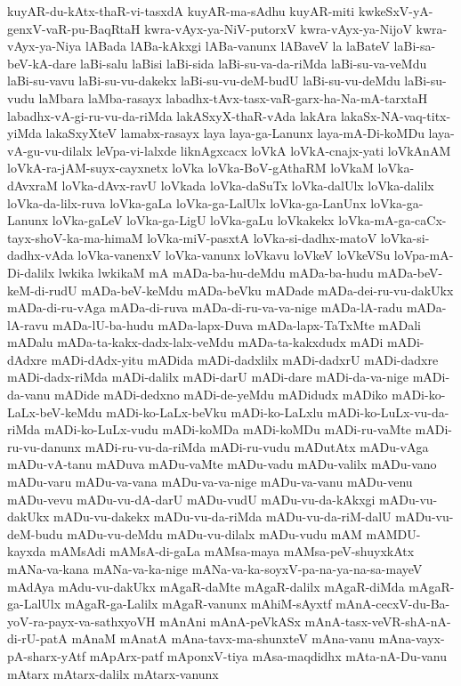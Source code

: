 {kuyAR-du-kAtx-thaR-vi-tasxdA
kuyAR-ma-sAdhu
kuyAR-miti
kwkeSxV-yA-genxV-vaR-pu-BaqRtaH
kwra-vAyx-ya-NiV-putorxV
kwra-vAyx-ya-NijoV
kwra-vAyx-ya-Niya
lABada
lABa-kAkxgi
lABa-vanunx
lABaveV
la
laBateV
laBi-sa-beV-kA-dare
laBi-salu
laBisi
laBi-sida
laBi-su-va-da-riMda
laBi-su-va-veMdu
laBi-su-vavu
laBi-su-vu-dakekx
laBi-su-vu-deM-budU
laBi-su-vu-deMdu
laBi-su-vudu
laMbara
laMba-rasayx
labadhx-tAvx-tasx-vaR-garx-ha-Na-mA-tarxtaH
labadhx-vA-gi-ru-vu-da-riMda
lakASxyX-thaR-vAda
lakAra
lakaSx-NA-vaq-titx-yiMda
lakaSxyXteV
lamabx-rasayx
laya
laya-ga-Lanunx
laya-mA-Di-koMDu
laya-vA-gu-vu-dilalx
leVpa-vi-lalxde
liknAgxcacx
loVkA
loVkA-cnajx-yati
loVkAnAM
loVkA-ra-jAM-suyx-cayxnetx
loVka
loVka-BoV-gAthaRM
loVkaM
loVka-dAvxraM
loVka-dAvx-ravU
loVkada
loVka-daSuTx
loVka-dalUlx
loVka-dalilx
loVka-da-lilx-ruva
loVka-gaLa
loVka-ga-LalUlx
loVka-ga-LanUnx
loVka-ga-Lanunx
loVka-gaLeV
loVka-ga-LigU
loVka-gaLu
loVkakekx
loVka-mA-ga-caCx-tayx-shoV-ka-ma-himaM
loVka-miV-pasxtA
loVka-si-dadhx-matoV
loVka-si-dadhx-vAda
loVka-vanenxV
loVka-vanunx
loVkavu
loVkeV
loVkeVSu
loVpa-mA-Di-dalilx
lwkika
lwkikaM
mA
mADa-ba-hu-deMdu
mADa-ba-hudu
mADa-beV-keM-di-rudU
mADa-beV-keMdu
mADa-beVku
mADade
mADa-dei-ru-vu-dakUkx
mADa-di-ru-vAga
mADa-di-ruva
mADa-di-ru-va-va-nige
mADa-lA-radu
mADa-lA-ravu
mADa-lU-ba-hudu
mADa-lapx-Duva
mADa-lapx-TaTxMte
mADali
mADalu
mADa-ta-kakx-dadx-lalx-veMdu
mADa-ta-kakxdudx
mADi
mADi-dAdxre
mADi-dAdx-yitu
mADida
mADi-dadxlilx
mADi-dadxrU
mADi-dadxre
mADi-dadx-riMda
mADi-dalilx
mADi-darU
mADi-dare
mADi-da-va-nige
mADi-da-vanu
mADide
mADi-dedxno
mADi-de-yeMdu
mADidudx
mADiko
mADi-ko-LaLx-beV-keMdu
mADi-ko-LaLx-beVku
mADi-ko-LaLxlu
mADi-ko-LuLx-vu-da-riMda
mADi-ko-LuLx-vudu
mADi-koMDa
mADi-koMDu
mADi-ru-vaMte
mADi-ru-vu-danunx
mADi-ru-vu-da-riMda
mADi-ru-vudu
mADutAtx
mADu-vAga
mADu-vA-tanu
mADuva
mADu-vaMte
mADu-vadu
mADu-valilx
mADu-vano
mADu-varu
mADu-va-vana
mADu-va-va-nige
mADu-va-vanu
mADu-venu
mADu-vevu
mADu-vu-dA-darU
mADu-vudU
mADu-vu-da-kAkxgi
mADu-vu-dakUkx
mADu-vu-dakekx
mADu-vu-da-riMda
mADu-vu-da-riM-dalU
mADu-vu-deM-budu
mADu-vu-deMdu
mADu-vu-dilalx
mADu-vudu
mAM
mAMDU-kayxda
mAMsAdi
mAMsA-di-gaLa
mAMsa-maya
mAMsa-peV-shuyxkAtx
mANa-va-kana
mANa-va-ka-nige
mANa-va-ka-soyxV-pa-na-ya-na-sa-mayeV
mAdAya
mAdu-vu-dakUkx
mAgaR-daMte
mAgaR-dalilx
mAgaR-diMda
mAgaR-ga-LalUlx
mAgaR-ga-Lalilx
mAgaR-vanunx
mAhiM-sAyxtf
mAnA-cecxV-du-Ba-yoV-ra-payx-va-sathxyoVH
mAnAni
mAnA-peVkASx
mAnA-tasx-veVR-shA-nA-di-rU-patA
mAnaM
mAnatA
mAna-tavx-ma-shunxteV
mAna-vanu
mAna-vayx-pA-sharx-yAtf
mApArx-patf
mAponxV-tiya
mAsa-maqdidhx
mAta-nA-Du-vanu
mAtarx
mAtarx-dalilx
mAtarx-vanunx
}
